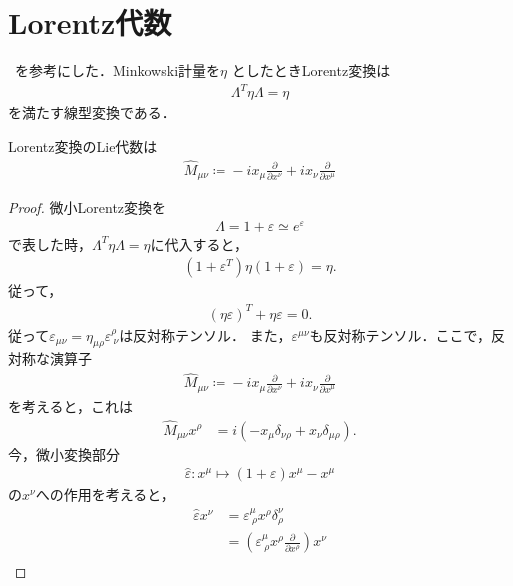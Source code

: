\section{Lorentz代数}
~\cite{adhara_blog_c31}を参考にした．Minkowski計量を\(\eta\)
としたときLorentz変換は
\begin{align}
	\Lambda^{T}\eta\Lambda=\eta
\end{align}
を満たす線型変換である．
\begin{prop}[Lorentz代数]
	Lorentz変換のLie代数は
	\begin{align}
		\hat{M}_{\mu\nu}\coloneqq{}-ix_{\mu}\frac{\partial}{\partial{}x^{\nu}}+ix_{\nu}\frac{\partial}{\partial{}x^{\mu}}
	\end{align}
\end{prop}
\begin{proof}
	微小Lorentz変換を
	\begin{align}
		\Lambda=1+\varepsilon\simeq{}e^{\varepsilon}
	\end{align}
	で表した時，\(\Lambda^{T}\eta\Lambda=\eta\)に代入すると，
	\begin{align}
		(1+\varepsilon^{T})\eta(1+\varepsilon)=\eta.
	\end{align}
	従って，
	\begin{align}
		(\eta\varepsilon)^{T}+\eta\varepsilon=0.
	\end{align}
	従って\(\varepsilon_{\mu\nu}=\eta_{\mu\rho}\varepsilon^{\rho}_{\ \nu}\)は反対称テンソル．
	また，\(\varepsilon^{\mu\nu}\)も反対称テンソル．ここで，反対称な演算子
	\begin{align}
		\hat{M}_{\mu\nu}\coloneqq{}-ix_{\mu}\frac{\partial}{\partial{}x^{\nu}}+ix_{\nu}\frac{\partial}{\partial{}x^{\mu}}
	\end{align}
	を考えると，これは
	\begin{align}
		\hat{M}_{\mu\nu}x^{\rho} & =i(-x_{\mu}\delta_{\nu\rho}+x_{\nu}\delta_{\mu\rho}).
	\end{align}
	今，微小変換部分
	\begin{align}
		\hat{\varepsilon}:x^{\mu}\mapsto{}(1+\varepsilon)x^{\mu}-x^{\mu}
	\end{align}
	の\(x^{\nu}\)への作用を考えると，
	\begin{align}
		\hat{\varepsilon}x^{\nu} & =\varepsilon^{\mu}_{\ \rho}x^{\rho}\delta^{\nu}_{\rho}                                     \\
		                         & =\left(\varepsilon^{\mu}_{\ \rho}x^{\rho}\frac{\partial}{\partial{}x^{\rho}}\right)x^{\nu} \\

\end{align}
\end{proof}
